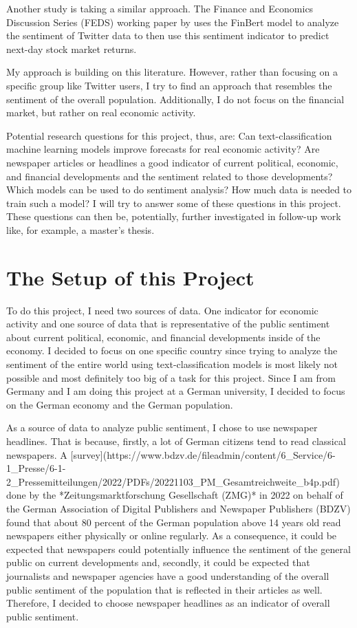 \documentclass[11pt, a4paper, leqno]{article}
\begin{document}
Another study is taking a similar approach. The Finance and Economics Discussion Series (FEDS) working paper by \textcite{Adams2023} uses the FinBert model to analyze the sentiment of Twitter data to then use this sentiment indicator to predict next-day stock market returns.

My approach is building on this literature. However, rather than focusing on a specific group like Twitter users, I try to find an approach that resembles the sentiment of the overall population. Additionally, I do not focus on the financial market, but rather on real economic activity.

Potential research questions for this project, thus, are: Can text-classification machine learning models improve forecasts for real economic activity? Are newspaper articles or headlines a good indicator of current political, economic, and financial developments and the sentiment related to those developments? Which models can be used to do sentiment analysis? How much data is needed to train such a model?
I will try to answer some of these questions in this project. These questions can then be, potentially, further investigated in follow-up work like, for example, a master's thesis.

\section{The Setup of this Project}

To do this project, I need two sources of data. One indicator for economic activity and one source of data that is representative of the public sentiment about current political, economic, and financial developments inside of the economy. I decided to focus on one specific country since trying to analyze the sentiment of the entire world using text-classification models is most likely not possible and most definitely too big of a task for this project. Since I am from Germany and I am doing this project at a German university, I decided to focus on the German economy and the German population. 

As a source of data to analyze public sentiment, I chose to use newspaper headlines. That is because, firstly, a lot of German citizens tend to read classical newspapers. A [survey](https://www.bdzv.de/fileadmin/content/6_Service/6-1_Presse/6-1-2_Pressemitteilungen/2022/PDFs/20221103_PM_Gesamtreichweite_b4p.pdf) done by the *Zeitungsmarktforschung Gesellschaft (ZMG)* in 2022 on behalf of the German Association of Digital Publishers and Newspaper Publishers (BDZV) found that about 80 percent of the German population above 14 years old read newspapers either physically or online regularly. As a consequence, it could be expected that newspapers could potentially influence the sentiment of the general public on current developments and, secondly, it could be expected that journalists and newspaper agencies have a good understanding of the overall public sentiment of the population that is reflected in their articles as well. Therefore, I decided to choose newspaper headlines as an indicator of overall public sentiment.
\end{document}
